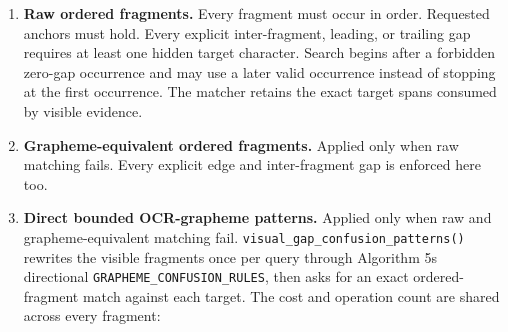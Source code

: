 \begin{enumerate}
\def\labelenumi{\arabic{enumi}.}
\tightlist
\item
  \textbf{Raw ordered fragments.} Every fragment must occur in order. Requested anchors must hold. Every explicit inter-fragment, leading, or trailing gap requires at least one hidden target character. Search begins after a forbidden zero-gap occurrence and may use a later valid occurrence instead of stopping at the first occurrence. The matcher retains the exact target spans consumed by visible evidence.
\item
  \textbf{Grapheme-equivalent ordered fragments.} Applied only when raw matching fails. Every explicit edge and inter-fragment gap is enforced here too.
\item
  \textbf{Direct bounded OCR-grapheme patterns.} Applied only when raw and grapheme-equivalent matching fail. \texttt{visual\_\allowbreak{}gap\_\allowbreak{}confusion\_\allowbreak{}patterns()} rewrites the visible fragments once per query through Algorithm 5\textquotesingle s directional \texttt{GRAPHEME\_\allowbreak{}CONFUSION\_\allowbreak{}RULES}, then asks for an exact ordered-fragment match against each target. The cost and operation count are shared across every fragment:


\end{enumerate}
